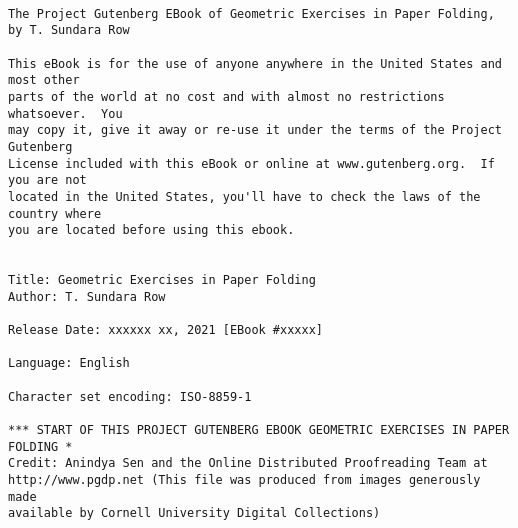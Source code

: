 \documentclass{book}[2021/07/26]
\begin{document}
\thispagestyle{empty}
\small
\begin{verbatim}

The Project Gutenberg EBook of Geometric Exercises in Paper Folding,
by T. Sundara Row                                                  

This eBook is for the use of anyone anywhere in the United States and most other
parts of the world at no cost and with almost no restrictions whatsoever.  You
may copy it, give it away or re-use it under the terms of the Project Gutenberg
License included with this eBook or online at www.gutenberg.org.  If you are not
located in the United States, you'll have to check the laws of the country where
you are located before using this ebook.


Title: Geometric Exercises in Paper Folding
Author: T. Sundara Row

Release Date: xxxxxx xx, 2021 [EBook #xxxxx]

Language: English

Character set encoding: ISO-8859-1

*** START OF THIS PROJECT GUTENBERG EBOOK GEOMETRIC EXERCISES IN PAPER FOLDING *                       
Credit: Anindya Sen and the Online Distributed Proofreading Team at
http://www.pgdp.net (This file was produced from images generously made
available by Cornell University Digital Collections)

\end{verbatim}
\normalsize
\newpage
\end{document}
